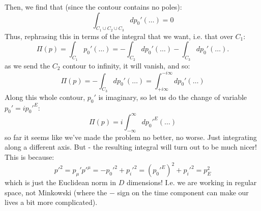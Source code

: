 \begin{itemize}
    Then, we find that (since the contour contains no poles):
    \begin{equation}
        \int_{C_1 \cup C_2 \cup C_3} dp_0' (\ldots) = 0
    \end{equation}
    Thus, rephrasing this in terms of the integral that we want, i.e. that over $C_1$:
    \begin{equation}
        \Pi(p) = \int_{C_1}p_0' (\ldots)  = -\int_{C_2} dp_0'(\ldots) - \int_{C_3} dp_0'(\ldots).
    \end{equation}
    as we send the $C_2$ contour to infinity, it will vanish, and so:
    \begin{equation}
        \Pi(p) = -\int_{C_3} dp_0'(\ldots) = \int_{+i\infty}^{-i\infty}dp_0' (\ldots)
    \end{equation}
    Along this whole contour, $p_0'$ is imaginary, so let us do the change of variable $p_0' = ip_0'^E$:
    \begin{equation}
        \Pi(p) = i\int_{-\infty}^\infty dp_0'^E (\ldots)
    \end{equation}
    so far it seems like we've made the problem no better, no worse. Just integrating along a different axis. But - the resulting integral will turn out to be much nicer! This is because:
    \begin{equation}
        p'^2 = p_\mu' p'^\mu = -p_0'^2 + p_i'^2 = (p_0'^E)^2 + p_i'^2 = p_E^2
    \end{equation}
    which is just the Euclidean norm in $D$ dimensions! I.e. we are working in regular space, not Minkowski (where the $-$ sign on the time component can make our lives a bit more complicated).
\end{itemize}

